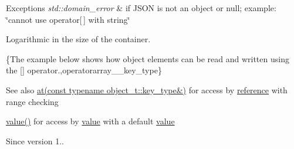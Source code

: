 \begin{DoxyExceptions}{Exceptions}
{\em std\+::domain\+\_\+error} & if J\+S\+ON is not an object or null; example\+: {\ttfamily \char`\"{}cannot use operator\mbox{[}$\,$\mbox{]} with string\char`\"{}}\\
\hline
\end{DoxyExceptions}
Logarithmic in the size of the container.

\{The example below shows how object elements can be read and written using the {\ttfamily \mbox{[}\mbox{]}} operator.,operatorarray\+\_\+\+\_\+key\+\_\+type\}

\begin{DoxySeeAlso}{See also}
\hyperlink{classnlohmann_1_1basic__json_a7ed92d56cb313b243c1917696ffdf074}{at(const typename object\+\_\+t\+::key\+\_\+type\&)} for access by \hyperlink{classnlohmann_1_1basic__json_a3ec8e17be8732fe436e9d6733f52b7a3}{reference} with range checking 

\hyperlink{classnlohmann_1_1basic__json_a407e73a037e6e3067ef7aa2c25a79f39}{value()} for access by \hyperlink{classnlohmann_1_1basic__json_a407e73a037e6e3067ef7aa2c25a79f39}{value} with a default \hyperlink{classnlohmann_1_1basic__json_a407e73a037e6e3067ef7aa2c25a79f39}{value}
\end{DoxySeeAlso}
\begin{DoxySince}{Since}
version 1.. 
\end{DoxySince}
\hypertarget{classnlohmann_1_1basic__json_a95d9c6a59674193aa55798968d1a9de6}{}\label{classnlohmann_1_1basic__json_a95d9c6a59674193aa55798968d1a9de6} 
